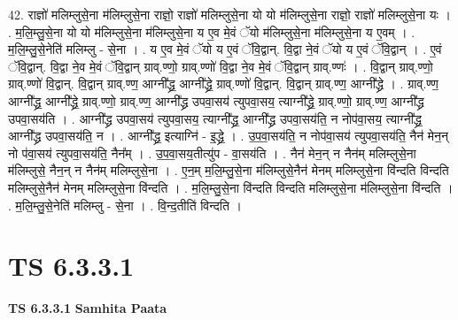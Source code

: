 \documentclass[17pt]{extarticle}
\begin{document}
42. राज्ञो॑ मलिम्लुसे॒ना म॑लिम्लुसे॒ना राज्ञो॒ राज्ञो॑ मलिम्लुसे॒ना यो यो म॑लिम्लुसे॒ना राज्ञो॒ राज्ञो॑ मलिम्लुसे॒ना यः । . म॒लि॒म्लु॒से॒ना यो यो म॑लिम्लुसे॒ना म॑लिम्लुसे॒ना य ए॒व मे॒वं ॅयो म॑लिम्लुसे॒ना म॑लिम्लुसे॒ना य ए॒वम् । . म॒लि॒म्लु॒से॒नेति॑ मलिम्लु - से॒ना । . य ए॒व मे॒वं ॅयो य ए॒वं ॅवि॒द्वान्. वि॒द्वा ने॒वं ॅयो य ए॒वं ॅवि॒द्वान् । . ए॒वं ॅवि॒द्वान्. वि॒द्वा ने॒व मे॒वं ॅवि॒द्वान् ग्राव्.ण्णो॒ ग्राव्.ण्णो॑ वि॒द्वा ने॒व मे॒वं ॅवि॒द्वान् ग्राव्.ण्णः॑ । . वि॒द्वान् ग्राव्.ण्णो॒ ग्राव्.ण्णो॑ वि॒द्वान्. वि॒द्वान् ग्राव्.ण्ण॒ आग्नी᳚द्ध्र॒ आग्नी᳚द्ध्रे॒ ग्राव्.ण्णो॑ वि॒द्वान्. वि॒द्वान् ग्राव्.ण्ण॒ आग्नी᳚द्ध्रे । . ग्राव्.ण्ण॒ आग्नी᳚द्ध्र॒ आग्नी᳚द्ध्रे॒ ग्राव्.ण्णो॒ ग्राव्.ण्ण॒ आग्नी᳚द्ध्र उपवा॒सय॑ त्युपवा॒सय॒ त्याग्नी᳚द्ध्रे॒ ग्राव्.ण्णो॒ ग्राव्.ण्ण॒ आग्नी᳚द्ध्र उपवा॒सय॑ति । . आग्नी᳚द्ध्र उपवा॒सय॑ त्युपवा॒सय॒ त्याग्नी᳚द्ध्र॒ आग्नी᳚द्ध्र उपवा॒सय॑ति॒ न नोप॑वा॒सय॒ त्याग्नी᳚द्ध्र॒ आग्नी᳚द्ध्र उपवा॒सय॑ति॒ न । . आग्नी᳚द्ध्र॒ इत्याग्नि॑ - इ॒द्ध्रे॒ । . उ॒प॒वा॒सय॑ति॒ न नोप॑वा॒सय॑ त्युपवा॒सय॑ति॒ नैन॑ मेन॒न् नो प॑वा॒सय॑ त्युपवा॒सय॑ति॒ नैन᳚म् । . उ॒प॒वा॒सय॒तीत्यु॑प - वा॒सय॑ति । . नैन॑ मेन॒न् न नैन॑म् मलिम्लुसे॒ना म॑लिम्लुसे॒ नैन॒न् न नैन॑म् मलिम्लुसे॒ना । . ए॒न॒म् म॒लि॒म्लु॒से॒ना म॑लिम्लुसे॒नैन॑ मेनम् मलिम्लुसे॒ना वि॑न्दति विन्दति मलिम्लुसे॒नैन॑ मेनम् मलिम्लुसे॒ना वि॑न्दति । . म॒लि॒म्लु॒से॒ना वि॑न्दति विन्दति मलिम्लुसे॒ना म॑लिम्लुसे॒ना वि॑न्दति । . म॒लि॒म्लु॒से॒नेति॑ मलिम्लु - से॒ना । . वि॒न्द॒तीति॑ विन्दति । \newline
\pagebreak
{}

\section{ TS 6.3.3.1 }

\textbf{TS 6.3.3.1 } \newline
\textbf{Samhita Paata} \newline
\end{document}
